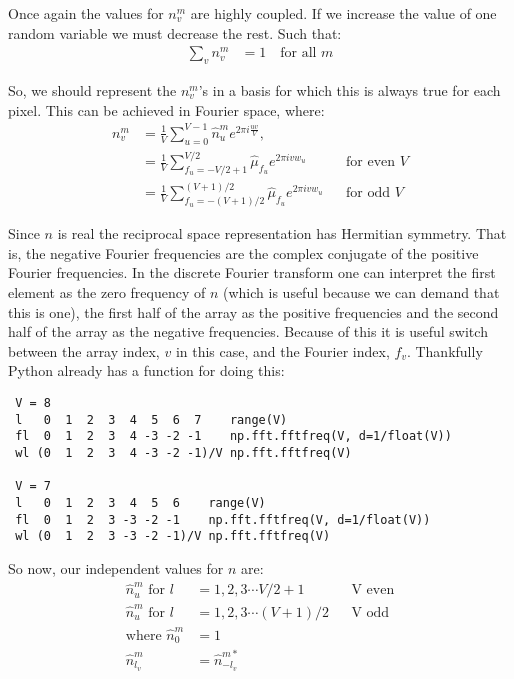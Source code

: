 \documentclass[11pt]{article}
\begin{document}
Once again the values for $n^m_v$ are highly coupled. If we increase the value of one random variable we must decrease the rest. Such that:
\begin{align}
   \sum_v n^m_v &= 1  \quad \text{for all } m 
\end{align}

So, we should represent the $n^m_v$'s in a basis for which this is always true for each pixel. This can be achieved in Fourier space, where:
\begin{align} 
   n^m_v &= \frac{1}{V} \sum_{u=0}^{V-1} \hat{n}^m_u e^{2\pi i \frac{u v}{V}}, &&\\
   &= \frac{1}{V} \sum_{f_u=-V/2+1}^{V/2} \hat{\mu}_{f_u} e^{2\pi i v w_u}       &&\text{for even } V \\
   &= \frac{1}{V} \sum_{f_u=-(V+1)/2}^{(V+1)/2} \hat{\mu}_{f_u} e^{2\pi i v w_u} &&\text{for odd } V
\end{align}

Since $n$ is real the reciprocal space representation has Hermitian symmetry. That is, the negative Fourier frequencies are the complex conjugate of the positive Fourier frequencies. In the discrete Fourier transform one can interpret the first element as the zero frequency of $n$ (which is useful because we can demand that this is one), the first half of the array as the positive frequencies and the second half of the array as the negative frequencies. Because of this it is useful switch between the array index, $v$ in this case, and the Fourier index, $f_v$. Thankfully Python already has a function for doing this:

\begin{verbatim}
 V = 8
 l   0  1  2  3  4  5  6  7    range(V)
 fl  0  1  2  3  4 -3 -2 -1    np.fft.fftfreq(V, d=1/float(V))
 wl (0  1  2  3  4 -3 -2 -1)/V np.fft.fftfreq(V)
 
 V = 7
 l   0  1  2  3  4  5  6    range(V)
 fl  0  1  2  3 -3 -2 -1    np.fft.fftfreq(V, d=1/float(V))
 wl (0  1  2  3 -3 -2 -1)/V np.fft.fftfreq(V)
\end{verbatim}

So now, our independent values for $n$ are:
\begin{align}
   \hat{n}^m_u \text{  for } l &= 1, 2, 3 \cdots V/2 + 1 &&\text{V even}\\
   \hat{n}^m_u \text{  for } l &= 1, 2, 3 \cdots (V+1)/2 &&\text{V odd}\\
\text{where  }   \hat{n}^m_0 &= 1   && \\
                 \hat{n}^m_{l_v} &= \hat{n}^{m*}_{-l_v} &&
\end{align}
\end{document}

